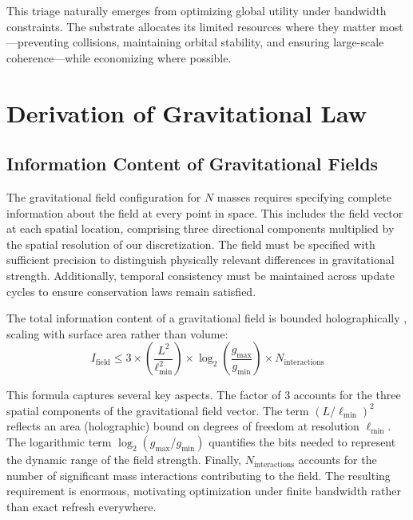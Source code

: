 \documentclass[twocolumn,prd,amsmath,amssymb,aps,superscriptaddress,nofootinbib]{revtex4-2}
\begin{document}
This triage naturally emerges from optimizing global utility under bandwidth constraints. The substrate allocates its limited resources where they matter most---preventing collisions, maintaining orbital stability, and ensuring large-scale coherence---while economizing where possible.

\section{Derivation of Gravitational Law}
\label{sec:derivation}

\subsection{Information Content of Gravitational Fields}

The gravitational field configuration for $N$ masses requires specifying complete information about the field at every point in space. This includes the field vector at each spatial location, comprising three directional components multiplied by the spatial resolution of our discretization. The field must be specified with sufficient precision to distinguish physically relevant differences in gravitational strength. Additionally, temporal consistency must be maintained across update cycles to ensure conservation laws remain satisfied.

The total information content of a gravitational field is bounded holographically \cite{Bekenstein1973, tHooft1993}, scaling with surface area rather than volume:
\begin{equation}
I_{\text{field}} \leq 3 \times \left(\frac{L^2}{\ell_{\text{min}}^2}\right) \times \log_2\left(\frac{g_{\text{max}}}{g_{\text{min}}}\right) \times N_{\text{interactions}}
\end{equation}

This formula captures several key aspects. The factor of 3 accounts for the three spatial components of the gravitational field vector. The term $(L/\ell_{\text{min}})^2$ reflects an area (holographic) bound on degrees of freedom at resolution $\ell_{\text{min}}$. The logarithmic term $\log_2(g_{\text{max}}/g_{\text{min}})$ quantifies the bits needed to represent the dynamic range of the field strength. Finally, $N_{\text{interactions}}$ accounts for the number of significant mass interactions contributing to the field. The resulting requirement is enormous, motivating optimization under finite bandwidth rather than exact refresh everywhere.
\end{document}
